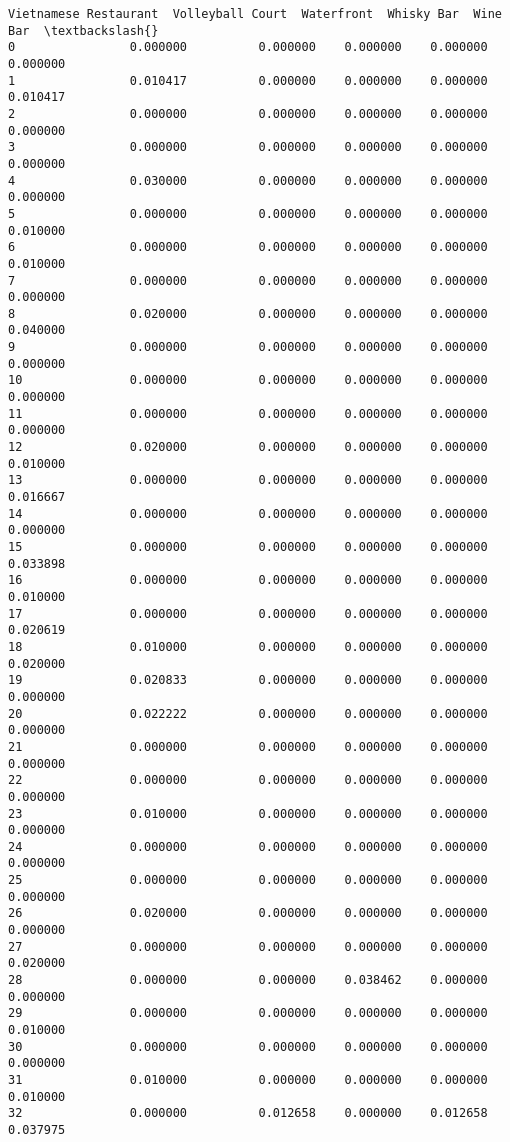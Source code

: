 \documentclass[11pt]{article}
\begin{document}
\begin{tcolorbox}[breakable, size=fbox, boxrule=.5pt, pad at break*=1mm, opacityfill=0]
\begin{Verbatim}[commandchars=\\\{\}]
    Vietnamese Restaurant  Volleyball Court  Waterfront  Whisky Bar  Wine Bar  \textbackslash{}
0                0.000000          0.000000    0.000000    0.000000  0.000000
1                0.010417          0.000000    0.000000    0.000000  0.010417
2                0.000000          0.000000    0.000000    0.000000  0.000000
3                0.000000          0.000000    0.000000    0.000000  0.000000
4                0.030000          0.000000    0.000000    0.000000  0.000000
5                0.000000          0.000000    0.000000    0.000000  0.010000
6                0.000000          0.000000    0.000000    0.000000  0.010000
7                0.000000          0.000000    0.000000    0.000000  0.000000
8                0.020000          0.000000    0.000000    0.000000  0.040000
9                0.000000          0.000000    0.000000    0.000000  0.000000
10               0.000000          0.000000    0.000000    0.000000  0.000000
11               0.000000          0.000000    0.000000    0.000000  0.000000
12               0.020000          0.000000    0.000000    0.000000  0.010000
13               0.000000          0.000000    0.000000    0.000000  0.016667
14               0.000000          0.000000    0.000000    0.000000  0.000000
15               0.000000          0.000000    0.000000    0.000000  0.033898
16               0.000000          0.000000    0.000000    0.000000  0.010000
17               0.000000          0.000000    0.000000    0.000000  0.020619
18               0.010000          0.000000    0.000000    0.000000  0.020000
19               0.020833          0.000000    0.000000    0.000000  0.000000
20               0.022222          0.000000    0.000000    0.000000  0.000000
21               0.000000          0.000000    0.000000    0.000000  0.000000
22               0.000000          0.000000    0.000000    0.000000  0.000000
23               0.010000          0.000000    0.000000    0.000000  0.000000
24               0.000000          0.000000    0.000000    0.000000  0.000000
25               0.000000          0.000000    0.000000    0.000000  0.000000
26               0.020000          0.000000    0.000000    0.000000  0.000000
27               0.000000          0.000000    0.000000    0.000000  0.020000
28               0.000000          0.000000    0.038462    0.000000  0.000000
29               0.000000          0.000000    0.000000    0.000000  0.010000
30               0.000000          0.000000    0.000000    0.000000  0.000000
31               0.010000          0.000000    0.000000    0.000000  0.010000
32               0.000000          0.012658    0.000000    0.012658  0.037975

\end{Verbatim}
\end{tcolorbox}
\end{document}
